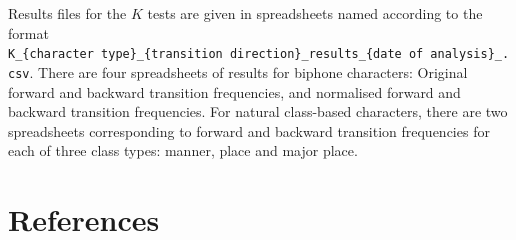 Results files for the \(K\) tests are given in spreadsheets named
according to the format
\texttt{K\_\{character\ type\}\_\{transition\ direction\}\_results\_\{date\ of\ analysis\}\_.csv}.
There are four spreadsheets of results for biphone characters: Original
forward and backward transition frequencies, and normalised forward and
backward transition frequencies. For natural class-based characters,
there are two spreadsheets corresponding to forward and backward
transition frequencies for each of three class types: manner, place and
major place.

\newpage

\section*{References}

\printbibliography[keyword=inA2,heading=none]

